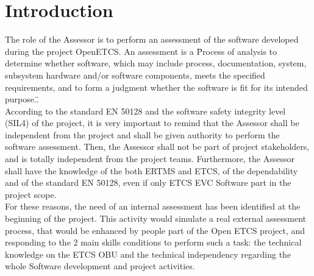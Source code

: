\documentclass{template/openetcs_report}
\begin{document}

\chapter{Introduction}
The role of the Assessor is to perform an assessment of the software developed during the project OpenETCS. An assessment is a \" Process of analysis to determine whether software, which may include process, documentation, system, subsystem hardware and/or software components, meets the specified requirements, and to form a judgment whether the software is fit for its intended purpose.\".
\\
According to the standard EN 50128 and the software safety integrity level (SIL4) of the project, it is very important to remind that the Assessor shall be independent from the project and shall be given authority to perform the software assessment. Then, the Assessor shall not be part of project stakeholders, and is totally independent from the project teams. Furthermore, the Assessor shall have the knowledge of the both ERTMS and ETCS, of the dependability and of the standard EN 50128, even if only ETCS EVC Software part in the project scope.
\\
For these reasons, the need of an internal assessment has been identified at the beginning of the project. This activity would simulate a real external assessment process, that would be  enhanced by people part of the Open ETCS project, and responding to the 2 main skills conditions to perform such a task: the technical knowledge on the ETCS OBU and the technical independency regarding the whole Software development and project activities. 
\end{document}
